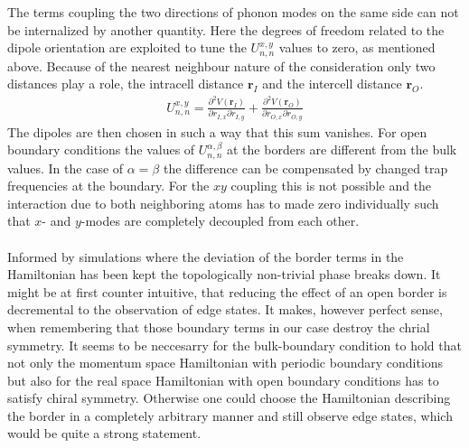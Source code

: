 The terms coupling the two directions of phonon modes on the same side can not be internalized by another quantity. Here the degrees of freedom related to the dipole orientation are exploited to tune the $U_{n,n}^{x,y}$ values to zero, as mentioned above. Because of the nearest neighbour nature of the consideration only two distances play a role, the intracell distance $\mathbf{r}_I$ and the intercell distance $\mathbf{r}_O$. 
\begin{align*}
    U_{n,n}^{x,y}= \frac{\partial^2 V(\mathbf{r}_{I})}{\partial {r}_{I,x}\partial r_{I,y}}+\frac{\partial^2 V(\mathbf{r}_{O})}{\partial {r}_{O,x}\partial r_{O,y}}
\end{align*}
The dipoles are then chosen in such a way that this sum vanishes. For open boundary conditions the values of $U_{n,n}^{\alpha,\beta}$ at the borders are different from the bulk values. In the case of $\alpha=\beta$ the difference can be compensated by changed trap frequencies at the boundary. For the $xy$ coupling this is not possible and the interaction due to both neighboring atoms has to made zero individually such that $x$- and $y$-modes are completely decoupled from each other. \\\\
Informed by simulations where the deviation of the border terms in the Hamiltonian has been kept the topologically non-trivial phase breaks down. It might be at first counter intuitive, that reducing the effect of an open border is decremental to the observation of edge states. It makes, however perfect sense, when remembering that those boundary terms in our case destroy the chrial symmetry. It seems to be neccesarry for the bulk-boundary condition to hold that not only the momentum space Hamiltonian with periodic boundary conditions but also for the real space Hamiltonian with open boundary conditions has to satisfy chiral symmetry. Otherwise one could choose the Hamiltonian describing the border in a completely arbitrary manner and still observe edge states, which would be quite a strong statement.



